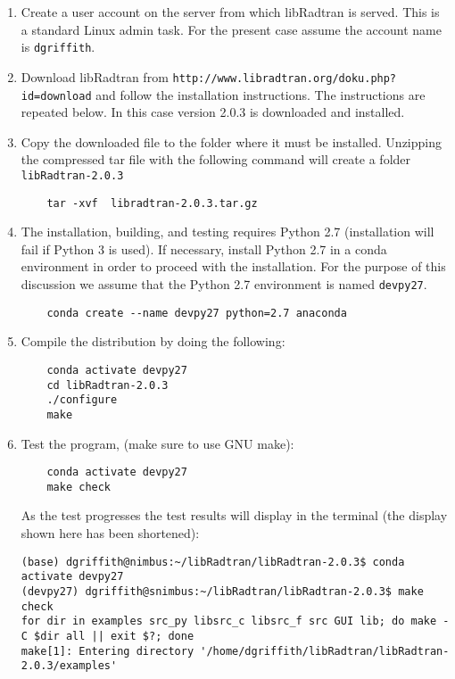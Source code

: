 \begin{enumerate}
\item Create a user account on the server from which libRadtran is served. This is a standard Linux admin task.  For the present case assume the account name is \lstinline{dgriffith}.

\item Download libRadtran from \lstinline{http://www.libradtran.org/doku.php?id=download} and follow the installation instructions. The instructions are repeated below.      In this case \libradtran{} version 2.0.3 is downloaded and installed.

\item Copy the downloaded file to the folder where it must be installed. Unzipping the compressed tar file with the following command will create a folder \lstinline{libRadtran-2.0.3}

\begin{lstlisting}
    tar -xvf  libradtran-2.0.3.tar.gz
\end{lstlisting}
\item The \libradtran{} installation, building, and testing requires Python 2.7 (installation will fail if Python 3 is used).  If necessary, install Python 2.7 in a conda environment in order to proceed with the \libradtran{} installation.  For the purpose of this discussion we assume that the Python 2.7 environment is named \lstinline{devpy27}.

\begin{lstlisting}
    conda create --name devpy27 python=2.7 anaconda
\end{lstlisting}

\item Compile the distribution by doing the following:

\begin{lstlisting}
    conda activate devpy27
    cd libRadtran-2.0.3
    ./configure
    make
\end{lstlisting}
\item Test the program, (make sure to use GNU make):

\begin{lstlisting}
    conda activate devpy27
    make check 
\end{lstlisting}
 As the test progresses the test results will display in the terminal (the display shown here has been shortened):
\begin{lstlisting}[style=tinysize]
(base) dgriffith@nimbus:~/libRadtran/libRadtran-2.0.3$ conda activate devpy27
(devpy27) dgriffith@snimbus:~/libRadtran/libRadtran-2.0.3$ make check
for dir in examples src_py libsrc_c libsrc_f src GUI lib; do make -C $dir all || exit $?; done
make[1]: Entering directory '/home/dgriffith/libRadtran/libRadtran-2.0.3/examples'


\end{lstlisting}
\end{enumerate}
